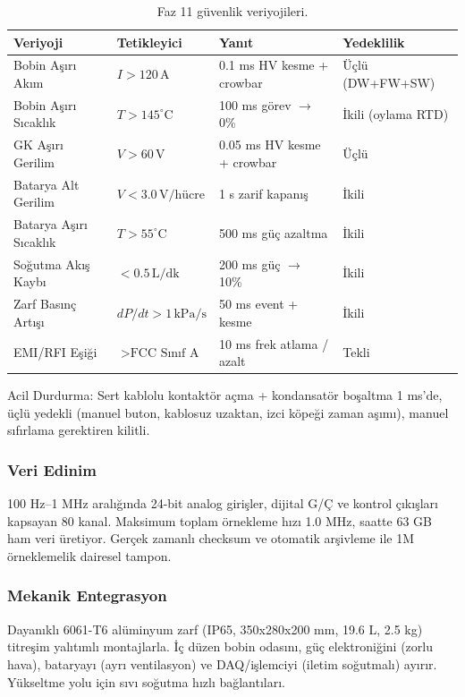 \begin{table}[t]
\centering
\caption{Faz 11 güvenlik veriyojileri.}
\label{tab:phase11-interlocks-tr}
\begin{tabular}{llll}
\hline
Veriyoji & Tetikleyici & Yanıt & Yedeklilik \\
\hline
Bobin Aşırı Akım & $I > 120\,\text{A}$ & 0.1 ms HV kesme + crowbar & Üçlü (DW+FW+SW) \\
Bobin Aşırı Sıcaklık & $T > 145^\circ\text{C}$ & 100 ms görev $\to$ 0\% & İkili (oylama RTD) \\
GK Aşırı Gerilim & $V > 60\,\text{V}$ & 0.05 ms HV kesme + crowbar & Üçlü \\
Batarya Alt Gerilim & $V < 3.0\,\text{V/hücre}$ & 1 s zarif kapanış & İkili \\
Batarya Aşırı Sıcaklık & $T > 55^\circ\text{C}$ & 500 ms güç azaltma & İkili \\
Soğutma Akış Kaybı & $< 0.5\,\text{L/dk}$ & 200 ms güç $\to$ 10\% & İkili \\
Zarf Basınç Artışı & $dP/dt > 1\,\text{kPa/s}$ & 50 ms event + kesme & İkili \\
EMI/RFI Eşiği & $> \text{FCC Sınıf A}$ & 10 ms frek atlama / azalt & Tekli \\
\hline
\end{tabular}
\end{table}

Acil Durdurma: Sert kablolu kontaktör açma + kondansatör boşaltma 1 ms'de, üçlü yedekli (manuel buton, kablosuz uzaktan, izci köpeği zaman aşımı), manuel sıfırlama gerektiren kilitli.

\subsubsection{Veri Edinim}

100 Hz--1 MHz aralığında 24-bit analog girişler, dijital G/Ç ve kontrol çıkışları kapsayan 80 kanal. Maksimum toplam örnekleme hızı 1.0 MHz, saatte 63 GB ham veri üretiyor. Gerçek zamanlı checksum ve otomatik arşivleme ile 1M örneklemelik dairesel tampon.

\subsubsection{Mekanik Entegrasyon}

Dayanıklı 6061-T6 alüminyum zarf (IP65, 350x280x200 mm, 19.6 L, 2.5 kg) titreşim yalıtımlı montajlarla. İç düzen bobin odasını, güç elektroniğini (zorlu hava), bataryayı (ayrı ventilasyon) ve DAQ/işlemciyi (iletim soğutmalı) ayırır. Yükseltme yolu için sıvı soğutma hızlı bağlantıları.

